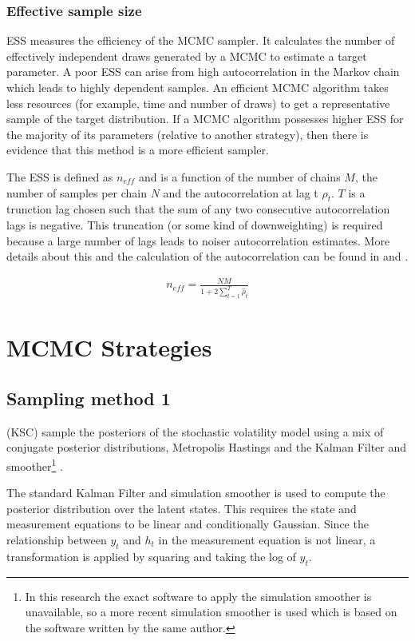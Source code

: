 \documentclass[12pt, a4paper]{article}
\begin{document}
            \subsubsection{Effective sample size}
            ESS measures the efficiency of the MCMC sampler. It calculates the number of effectively independent draws generated by a MCMC to estimate a target parameter. A poor ESS can arise from high autocorrelation in the Markov chain which leads to highly dependent samples. An efficient MCMC algorithm takes less resources (for example, time and number of draws) to get a representative sample of the target distribution. If a MCMC algorithm possesses higher ESS for the majority of its parameters (relative to another strategy), then there is evidence that this method is a more efficient sampler.
            
            The ESS is defined as $n_{eff}$ and is a function of the number of chains $M$, the number of samples per chain $N$ and the autocorrelation at lag t $\rho_t$. $T$ is a trunction lag chosen such that the sum of any two consecutive autocorrelation lags is negative. This truncation (or some kind of downweighting) is required because a large number of lags leads to noiser autocorrelation estimates. More details about this and the calculation of the autocorrelation can be found in \citep{vehtari2021rank} and \citet{geyer1992practical}.

            $$
            \begin{aligned}
                n_{eff} = \frac{NM}{1+2 \sum_{t=1}^T \hat{\rho}_t}
            \end{aligned}
            $$

\section{MCMC Strategies}

    \subsection{Sampling method 1}
        (KSC) sample the posteriors of the stochastic volatility model using a mix of conjugate posterior distributions, Metropolis Hastings and the Kalman Filter and smoother\footnote{In this research the exact software to apply the simulation smoother is unavailable, so a more recent simulation smoother is used which is based on the software written by the same author.} \citep{dejong1995}.

        The standard Kalman Filter and simulation smoother is used to compute the posterior distribution over the latent states. This requires the state and measurement equations to be linear and conditionally Gaussian. Since the relationship between $y_t$ and $h_t$ in the measurement equation is not linear, a transformation is applied by squaring and taking the log of $y_t$.
\end{document}
